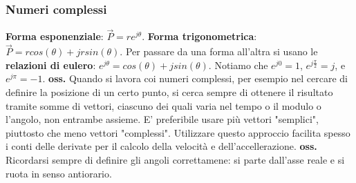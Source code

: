 \subsubsection{Numeri complessi}
\textbf{Forma esponenziale}: $\vec{P} = r e^{j \theta}$.\newline
\textbf{Forma trigonometrica}: $\vec{P} = r cos(\theta) + j r sin(\theta)$.\newline
\newline
Per passare da una forma all'altra si usano le \textbf{relazioni di eulero}: $e^{j \theta} = cos(\theta) + j sin(\theta)$.\newline
\newline
Notiamo che $e^{j 0} = 1$, $e^{j \frac{\pi}{2}} = j$, e $e^{j \pi} = -1$.\newline
\newline
\textbf{oss.} Quando si lavora coi numeri complessi, per esempio nel cercare di definire la posizione di un certo punto, si cerca sempre di ottenere il risultato tramite somme di vettori, ciascuno dei quali varia nel tempo o il modulo o l'angolo, non entrambe assieme. E' preferibile usare più vettori "semplici", piuttosto che meno vettori "complessi". Utilizzare questo approccio facilita spesso i conti delle derivate per il calcolo della velocità e dell'accellerazione.\newline
\newline
\textbf{oss.} Ricordarsi sempre di definire gli angoli correttamene: si parte dall'asse reale e si ruota in senso antiorario.